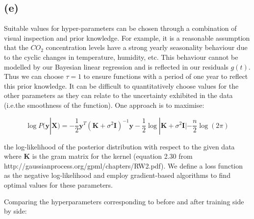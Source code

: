 \documentclass[12pt]{article}
\begin{document}
\subsection*{(e)}
Suitable values for hyper-parameters can be chosen through a combination of visual inspection and prior knowledge.
For example, it is a reasonable assumption that the $CO_2$ concentration levels have a strong yearly seasonality behaviour due to the cyclic changes in temperature, humidity, etc.
This behaviour cannot be modelled by our Bayesian linear regression and is reflected in our residuals $g(t)$.
Thus we can choose $\tau=1$ to ensure functions with a period of one year to reflect this prior knowledge.
It can be difficult to quantitatively choose values for the other parameters as they can relate to the uncertainty exhibited in the data (i.e.the smoothness of the function).
One approach is to maximise:

\[\log P(\textbf{y} | \textbf{X}) = -\frac{1}{2} \textbf{y}^T (\textbf{K} + \sigma^2\textbf{I})^{-1} \textbf{y} - \frac{1}{2} \log |\textbf{K}+ \sigma^2\textbf{I}| - \frac{n}{2}\log(2\pi)\]

the log-likelihood  of the posterior distribution with respect to the given data where $\textbf{K}$ is the gram matrix for the kernel (equation 2.30 from http://gaussianprocess.org/gpml/chapters/RW2.pdf).
We define a loss function as the negative log-likelihood and employ gradient-based algorithms to find optimal values for these parameters.

Comparing the hyperparameters corresponding to before and after training side by side:
\end{document}
